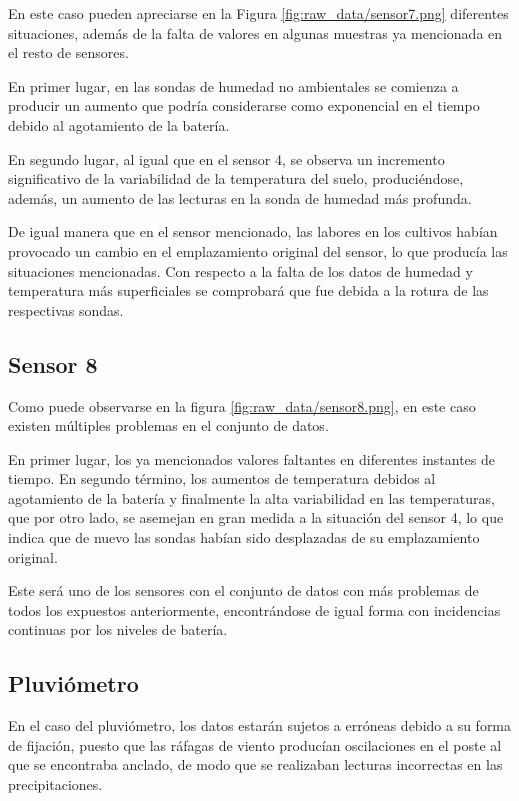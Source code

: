 
En este caso pueden apreciarse en la Figura \ref{fig:raw_data/sensor7.png} diferentes
situaciones, además de la falta de valores en algunas muestras ya mencionada en el 
resto de sensores.

En primer lugar, en las sondas de humedad no ambientales se comienza a producir un aumento
que podría considerarse como exponencial en el tiempo debido al agotamiento de la batería.

En segundo lugar, al igual que en el sensor 4, se observa un incremento significativo de la variabilidad
de la temperatura del suelo, produciéndose, además, un aumento de las lecturas en la sonda de
humedad más profunda.

De igual manera que en el sensor mencionado, las labores en los cultivos habían provocado un
cambio en el emplazamiento original del sensor, lo que producía las situaciones mencionadas.
Con respecto a la falta de los datos de humedad y temperatura más superficiales se 
comprobará que fue debida a la rotura de las respectivas sondas.

\newpage
\subsection{Sensor 8}


Como puede observarse en la figura \ref{fig:raw_data/sensor8.png}, en este caso existen 
múltiples problemas en el conjunto de datos.

En primer lugar, los ya mencionados valores faltantes en diferentes instantes de tiempo.
En segundo término, los aumentos de temperatura debidos al agotamiento de la batería y finalmente
la alta variabilidad en las temperaturas, que por otro lado, se asemejan en gran medida a la situación 
del sensor 4,
lo que indica que de nuevo las sondas habían sido desplazadas de su emplazamiento original.

Este será uno de los sensores con el conjunto de datos con más problemas de todos los 
expuestos anteriormente, encontrándose de igual forma con incidencias continuas por los niveles
de batería.

\newpage
\subsection{Pluviómetro}


En el caso del pluviómetro, los datos estarán sujetos a erróneas debido a su forma
de fijación, puesto que las ráfagas de viento producían oscilaciones
en el poste al que se encontraba anclado, de modo que se realizaban lecturas incorrectas
en las precipitaciones.
